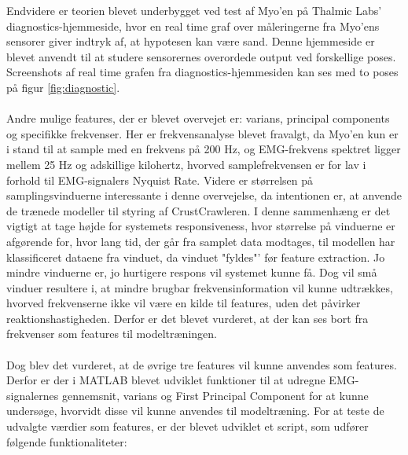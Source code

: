 Endvidere er teorien blevet underbygget ved test af Myo'en på Thalmic Labs' diagnostics-hjemmeside\citep{myoDiagnostik}, hvor en real time graf over måleringerne fra Myo'ens sensorer giver indtryk af, at hypotesen kan være sand. Denne hjemmeside er blevet anvendt til at studere sensorernes overordede output ved forskellige poses. Screenshots af real time grafen fra diagnostics-hjemmesiden kan ses med to poses på figur \ref{fig:diagnostic}.\\\\
Andre mulige features, der er blevet overvejet er: varians, principal components og specifikke frekvenser. Her er frekvensanalyse blevet fravalgt, da Myo'en kun er i stand til at sample med en frekvens på 200 Hz, og EMG-frekvens spektret ligger mellem 25 Hz og adskillige kilohertz\citep{websterEMG}, hvorved samplefrekvensen er for lav i forhold til EMG-signalers Nyquist Rate. Videre er størrelsen på samplingsvinduerne interessante i denne overvejelse, da intentionen er, at anvende de trænede modeller til styring af CrustCrawleren. I denne sammenhæng er det vigtigt at tage højde for systemets responsiveness, hvor størrelse på vinduerne er afgørende for, hvor lang tid, der går fra samplet data modtages, til modellen har klassificeret dataene fra vinduet, da vinduet "fyldes"' før feature extraction. Jo mindre vinduerne er, jo hurtigere respons vil systemet kunne få. Dog vil små vinduer resultere i, at mindre brugbar frekvensinformation vil kunne udtrækkes, hvorved frekvenserne ikke vil være en kilde til features, uden det påvirker reaktionshastigheden. Derfor er det blevet vurderet, at der kan ses bort fra frekvenser som features til modeltræningen.\\\\
Dog blev det vurderet, at de øvrige tre features vil kunne anvendes som features. Derfor er der i MATLAB blevet udviklet funktioner til at udregne EMG-signalernes gennemsnit, varians og First Principal Component for at kunne undersøge, hvorvidt disse vil kunne anvendes til modeltræning.  
For at teste de udvalgte værdier som features, er der blevet udviklet et script, som udfører følgende funktionaliteter:
